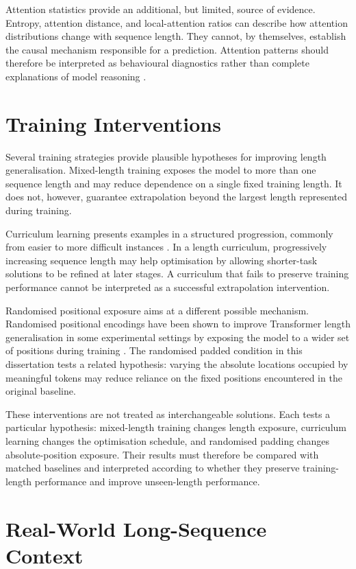 \documentclass[
    author={Aanchala Ravindra Bhongade},
    supervisor={Dr. Fernando Moreno-Pino},
    degree={MSc},
    title={Length Generalisation in Transformer-Based Sequence Models: Failure Taxonomy and Mitigation Strategies},
    subtitle={},
    type={},
    year={2026}
]{dissertation}
\begin{document}
Attention statistics provide an additional, but limited, source of evidence. Entropy, attention distance, and local-attention ratios can describe how attention distributions change with sequence length. They cannot, by themselves, establish the causal mechanism responsible for a prediction. Attention patterns should therefore be interpreted as behavioural diagnostics rather than complete explanations of model reasoning \cite{jain2019attention}.

\section{Training Interventions}

Several training strategies provide plausible hypotheses for improving length generalisation. Mixed-length training exposes the model to more than one sequence length and may reduce dependence on a single fixed training length. It does not, however, guarantee extrapolation beyond the largest length represented during training.

Curriculum learning presents examples in a structured progression, commonly from easier to more difficult instances \cite{bengio2009curriculum}. In a length curriculum, progressively increasing sequence length may help optimisation by allowing shorter-task solutions to be refined at later stages. A curriculum that fails to preserve training performance cannot be interpreted as a successful extrapolation intervention.

Randomised positional exposure aims at a different possible mechanism. Randomised positional encodings have been shown to improve Transformer length generalisation in some experimental settings by exposing the model to a wider set of positions during training \cite{ruoss2023randomized}. The randomised padded condition in this dissertation tests a related hypothesis: varying the absolute locations occupied by meaningful tokens may reduce reliance on the fixed positions encountered in the original baseline.

These interventions are not treated as interchangeable solutions. Each tests a particular hypothesis: mixed-length training changes length exposure, curriculum learning changes the optimisation schedule, and randomised padding changes absolute-position exposure. Their results must therefore be compared with matched baselines and interpreted according to whether they preserve training-length performance and improve unseen-length performance.

\section{Real-World Long-Sequence Context}
\end{document}
